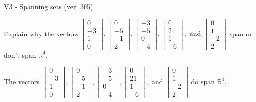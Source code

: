 \begin{exercise}
  \begin{exerciseTitle}V3 - Spanning sets (ver. 305)\end{exerciseTitle}
  \begin{exerciseStatement}
    Explain why the vectors \(\left[\begin{array}{r}
0 \\
-3 \\
1 \\
0
\end{array}\right] , \left[\begin{array}{r}
0 \\
-5 \\
-1 \\
2
\end{array}\right] , \left[\begin{array}{r}
-3 \\
-5 \\
0 \\
-4
\end{array}\right] , \left[\begin{array}{r}
0 \\
21 \\
1 \\
-6
\end{array}\right] , \text{ and } \left[\begin{array}{r}
0 \\
1 \\
-2 \\
2
\end{array}\right]\) span or don't span \(\mathbb{R}^4\). 
	


  \end{exerciseStatement}
  \begin{exerciseAnswer}
   The vectors \(\left[\begin{array}{r}
0 \\
-3 \\
1 \\
0
\end{array}\right] , \left[\begin{array}{r}
0 \\
-5 \\
-1 \\
2
\end{array}\right] , \left[\begin{array}{r}
-3 \\
-5 \\
0 \\
-4
\end{array}\right] , \left[\begin{array}{r}
0 \\
21 \\
1 \\
-6
\end{array}\right] , \text{ and } \left[\begin{array}{r}
0 \\
1 \\
-2 \\
2
\end{array}\right]\) 
  	 do  
	span \(\mathbb{R}^4\).
  



\end{exerciseAnswer}
\end{exercise}
